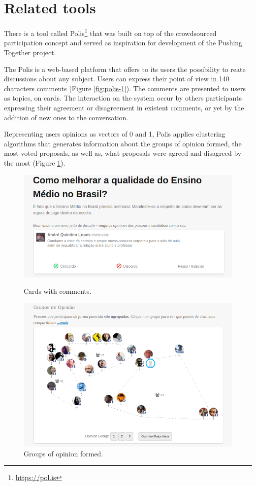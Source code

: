 \documentclass{llncs}
\begin{document}
\section{Related tools}

  There is a tool called Polis\footnote{\url{https://pol.is}} that was built
  on top of the crowdsourced participation concept and served as inspiration
  for development of the Pushing Together project.

  The Polis is a web-based platform that offers to its users the possibility to 
  reate discussions about any subject. Users can express their point of view
  in 140 characters comments (Figure \ref{fig:polis-1}). The comments are presented to users as topics,
  on cards. The interaction on the system occur by others participants expressing
  their agreement or disagreement in existent comments, or yet by the addition of
  new ones to the conversation. 

  Representing users opinions as vectors of 0 and 1, Polis applies clustering algorithms
  that generates information about the groups of opinion formed, the most voted
  proposals, as well as, what proposals were agreed and disagreed by the most (Figure \ref{fig:polis-2}). 

 \begin{figure}[hbt]
   \centering
   \begin{minipage}{.50\textwidth}
     \includegraphics[width=.9\linewidth]{images/polis1.png}
     \caption{Cards with comments.}
     \label{fig:polis-1}
   \end{minipage}
   \begin{minipage}{.49\textwidth}
     \includegraphics[width=.9\linewidth]{images/polis2.png}
     \caption{Groups of opinion formed.}
     \label{fig:polis-2}
   \end{minipage}
 \end{figure}
\end{document}
